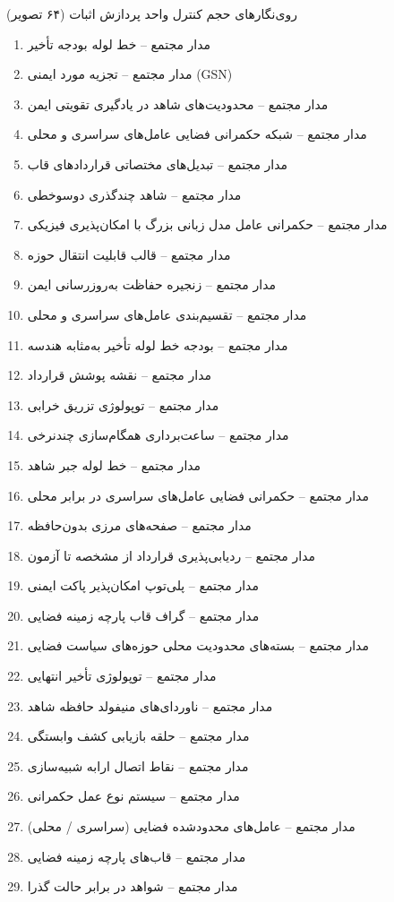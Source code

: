 \documentclass[10pt]{report}
\begin{document}
\begin{announcementbox}{روی‌نگارهای حجم کنترل واحد پردازش اثبات (۶۴ تصویر)}
\begin{enumerate}[leftmargin=*, label=\textcolor{primaryBlue}{\textbf{\arabic*.}}, itemsep=1pt, parsep=0pt]
  \item مدار مجتمع – خط لوله بودجه تأخیر
  \item مدار مجتمع – تجزیه مورد ایمنی (GSN)
  \item مدار مجتمع – محدودیت‌های شاهد در یادگیری تقویتی ایمن
  \item مدار مجتمع – شبکه حکمرانی فضایی عامل‌های سراسری و محلی
  \item مدار مجتمع – تبدیل‌های مختصاتی قراردادهای قاب
  \item مدار مجتمع – شاهد چندگذری دوسوخطی
  \item مدار مجتمع – حکمرانی عامل مدل زبانی بزرگ با امکان‌پذیری فیزیکی
  \item مدار مجتمع – قالب قابلیت انتقال حوزه
  \item مدار مجتمع – زنجیره حفاظت به‌روزرسانی ایمن
  \item مدار مجتمع – تقسیم‌بندی عامل‌های سراسری و محلی
  \item مدار مجتمع – بودجه خط لوله تأخیر به‌مثابه هندسه
  \item مدار مجتمع – نقشه پوشش قرارداد
  \item مدار مجتمع – توپولوژی تزریق خرابی
  \item مدار مجتمع – ساعت‌برداری همگام‌سازی چندنرخی
  \item مدار مجتمع – خط لوله جبر شاهد
  \item مدار مجتمع – حکمرانی فضایی عامل‌های سراسری در برابر محلی
  \item مدار مجتمع – صفحه‌های مرزی بدون‌حافظه
  \item مدار مجتمع – ردیابی‌پذیری قرارداد از مشخصه تا آزمون
  \item مدار مجتمع – پلی‌توپ امکان‌پذیر پاکت ایمنی
  \item مدار مجتمع – گراف قاب پارچه زمینه فضایی
  \item مدار مجتمع – بسته‌های محدودیت محلی حوزه‌های سیاست فضایی
  \item مدار مجتمع – توپولوژی تأخیر انتهایی
  \item مدار مجتمع – ناوردای‌های منیفولد حافظه شاهد
  \item مدار مجتمع – حلقه بازیابی کشف وابستگی
  \item مدار مجتمع – نقاط اتصال ارابه شبیه‌سازی
  \item مدار مجتمع – سیستم نوع عمل حکمرانی
  \item مدار مجتمع – عامل‌های محدودشده فضایی (سراسری / محلی)
  \item مدار مجتمع – قاب‌های پارچه زمینه فضایی
  \item مدار مجتمع – شواهد در برابر حالت گذرا

\end{enumerate}
\end{announcementbox}
\end{document}
